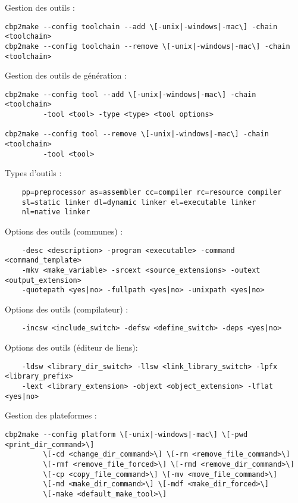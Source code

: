 \begin{samepage}
Gestion des outils :
\begin{verbatim}
cbp2make --config toolchain --add \[-unix|-windows|-mac\] -chain <toolchain>
cbp2make --config toolchain --remove \[-unix|-windows|-mac\] -chain <toolchain>
\end{verbatim}
\end{samepage}

Gestion des outils de génération :
\begin{verbatim}
cbp2make --config tool --add \[-unix|-windows|-mac\] -chain <toolchain>
         -tool <tool> -type <type> <tool options>
         
cbp2make --config tool --remove \[-unix|-windows|-mac\] -chain <toolchain>
         -tool <tool>
\end{verbatim}

Types d'outils :      
\begin{verbatim}
    pp=preprocessor as=assembler cc=compiler rc=resource compiler
    sl=static linker dl=dynamic linker el=executable linker
    nl=native linker
\end{verbatim}

Options des outils (communes) :
\begin{verbatim}
    -desc <description> -program <executable> -command <command_template>
    -mkv <make_variable> -srcext <source_extensions> -outext <output_extension>
    -quotepath <yes|no> -fullpath <yes|no> -unixpath <yes|no>
\end{verbatim}

Options des outils (compilateur) :
\begin{verbatim}
    -incsw <include_switch> -defsw <define_switch> -deps <yes|no>
\end{verbatim}

Options des outils (éditeur de liens):
\begin{verbatim}
    -ldsw <library_dir_switch> -llsw <link_library_switch> -lpfx <library_prefix>
    -lext <library_extension> -objext <object_extension> -lflat <yes|no>
\end{verbatim}

Gestion des plateformes :
\begin{verbatim}
cbp2make --config platform \[-unix|-windows|-mac\] \[-pwd <print_dir_command>\]
         \[-cd <change_dir_command>\] \[-rm <remove_file_command>\]
         \[-rmf <remove_file_forced>\] \[-rmd <remove_dir_command>\]
         \[-cp <copy_file_command>\] \[-mv <move_file_command>\]
         \[-md <make_dir_command>\] \[-mdf <make_dir_forced>\]
         \[-make <default_make_tool>\]         
\end{verbatim}


